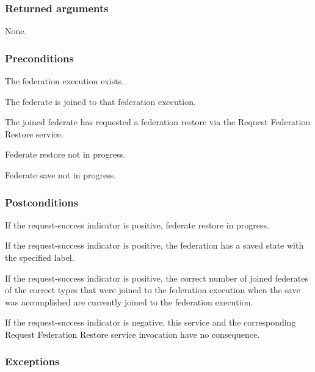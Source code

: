 \subsubsection{Returned arguments}

\begin{stdalphalist}
    \item None.
\end{stdalphalist}

\subsubsection{Preconditions}

\begin{stdalphalist}
    \item The federation execution exists.
    \item The federate is joined to that federation execution.
    \item The joined federate has requested a federation restore via the Request Federation Restore service.
    \item Federate restore not in progress.
    \item Federate save not in progress.
\end{stdalphalist}

\subsubsection{Postconditions}

\begin{stdalphalist}
    \item If the request-success indicator is positive, federate restore in progress.
    \item If the request-success indicator is positive, the federation has a saved state with the specified label.
    \item If the request-success indicator is positive, the correct number of joined federates of the correct types that were joined to the federation execution when the save was accomplished are currently joined to the federation execution.
    \item If the request-success indicator is negative, this service and the corresponding Request Federation Restore service invocation have no consequence.
\end{stdalphalist}

\subsubsection{Exceptions}

